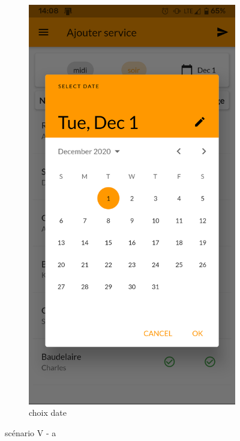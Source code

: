 \begin{figure}[!h]
\begin{subfigure}{.3\textwidth}
            \includegraphics[width=0.9\linewidth]{screenshots/scenario_05/ajout_service_b.png}
            \caption{choix date}
            \label{fig:choix_date}
        \end{subfigure}
        \caption{scénario V - a}
        \label{fig:scen05a}
    \end{figure}

